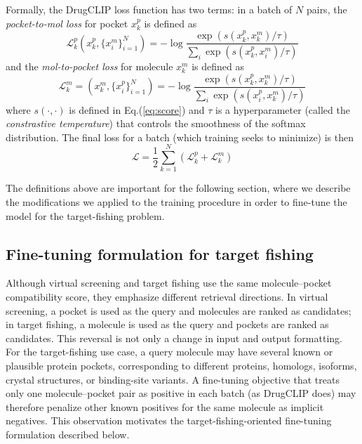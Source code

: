 \documentclass[12pt,fleqn]{article}
\begin{document}
Formally, the DrugCLIP loss function has two terms: in a batch of $N$
pairs, the \emph{pocket-to-mol loss} for pocket $x_k^p$ is defined as
\begin{equation}
  \label{eq:original-p2m-loss}
  \mathcal{L}_k^{p} (x_k^p, \{ x_i^m \}_{i=1}^N) =
  -\log
  \frac{
    \exp(s(x_k^p, x_k^m)/\tau)
  }{
    \sum_i \exp(s(x_k^p, x_i^m)/\tau)
  }
\end{equation}
and the \emph{mol-to-pocket loss} for molecule $x_k^m$ is defined as
\begin{equation}
  \label{eq:original-m2p-loss}
  \mathcal{L}_k^{m} = (x_k^m, \{ x_i^p \}_{i=1}^N) =
  -\log
  \frac{
    \exp(s(x_k^p, x_k^m)/\tau)
  }{
    \sum_i \exp(s(x_i^p, x_k^m)/\tau)
  }
\end{equation}
where $s(\cdot, \cdot)$ is defined in Eq.(\ref{eq:score}) and $\tau$
is a hyperparameter (called the \emph{constrastive
  temperature}) that
controls the smoothness of the softmax distribution. The final loss
for a batch (which training seeks to minimize) is then
\begin{equation}
  \label{eq:original-loss}
  \mathcal{L} = 
  \frac{1}{2}
  \sum_{k=1}^N
  \left(
    \mathcal{L}_k^{p} + \mathcal{L}_k^{m}
  \right)
\end{equation}

The definitions above are important for the following section, where
we describe the modifications we applied to the training procedure in
order to fine-tune the model for the target-fishing problem.


\subsection{Fine-tuning formulation for target fishing}

Although virtual screening and target fishing use the same
molecule--pocket compatibility score, they emphasize different
retrieval directions. In virtual screening, a pocket is used as the
query and molecules are ranked as candidates; in target fishing, a
molecule is used as the query and pockets are ranked as candidates.
This reversal is not only a change in input and output formatting. For
the target-fishing use case, a query molecule may have several known
or plausible protein pockets, corresponding to different proteins,
homologs, isoforms, crystal structures, or binding-site variants. A
fine-tuning objective that treats only one molecule--pocket pair as
positive in each batch (as DrugCLIP does) may therefore penalize other
known positives for the same molecule as implicit negatives. This
observation motivates the target-fishing-oriented fine-tuning
formulation described below.
\end{document}
